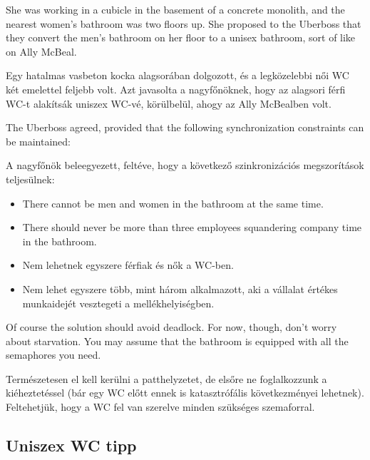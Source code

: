 \documentclass{book}
\newcommand{\clearemptydoublepage}{\newpage\cleardoublepage}
\begin{document}
She was working in a cubicle in the basement of a
concrete monolith, and the nearest women's bathroom was two floors up.
She proposed to the Uberboss that they convert the men's bathroom
on her floor to a unisex bathroom, sort of like on Ally McBeal.

Egy hatalmas vasbeton kocka alagsorában dolgozott, és a legközelebbi
női WC két emelettel feljebb volt.
Azt javasolta a nagyfőnöknek, hogy az alagsori férfi WC-t alakítsák
uniszex WC-vé, körülbelül, ahogy az Ally McBealben volt.

The Uberboss agreed, provided that the following synchronization
constraints can be maintained:

A nagyfőnök beleegyezett, feltéve, hogy a következő szinkronizációs
megszorítások teljesülnek:

\begin {itemize}

\item There cannot be men and women in the bathroom
at the same time.

\item There should never be more than three
employees squandering company time in the bathroom.

\end{itemize}

\begin {itemize}

\item Nem lehetnek egyszere férfiak és nők a WC-ben.

\item Nem lehet egyszere több, mint három alkalmazott,
aki a vállalat értékes munkaidejét vesztegeti a mellékhelyiségben.

\end{itemize}

Of course the solution should avoid deadlock.  For now, though, don't
worry about starvation.  You may assume that the bathroom is equipped
with all the semaphores you need.

Természetesen el kell kerülni a patthelyzetet, de elsőre ne
foglalkozzunk a kiéheztetéssel (bár egy WC előtt ennek is katasztrófális
következményei lehetnek). Feltehetjük, hogy a WC fel van szerelve minden
szükséges szemaforral.


\clearemptydoublepage
\subsection{Uniszex WC tipp}
\end{document}
